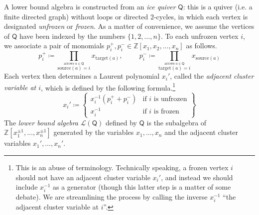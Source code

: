 \documentclass[ALCO,published]{cedram}
\numberwithin{equation}{section}
\renewcommand{\L}{\mathcal{L}}%
\newcommand{\1}{^{-1}}
\def\ZZ{\mathbb{Z}}
\def\Q{\mathsf{Q}}
\begin{document}
A lower bound algebra is constructed from an \textit{ice quiver} $\Q$: this is a quiver (i.e. a finite directed graph) without loops or directed $2$-cycles, in which each vertex is designated \textit{unfrozen} or \textit{frozen}.
As a matter of convenience, we assume the vertices of $\Q$ have been indexed by the numbers $\{1,2,\dots,n\}$.  To each unfrozen vertex $i$, we associate a pair of monomials $p_i^+,p_i^-\in \ZZ[x_1,x_2,\dots,x_n]$ as follows.
\begin{equation}
p_i^+ \coloneqq \prod_{\stackrel{\text{arrows }a\in \Q}{\text{source}(a)=i}}x_{\text{target}(a)},\hspace{1cm} p_i^- \coloneqq \prod_{\stackrel{\text{arrows }a\in \Q}{\text{target}(a)=i}}x_{\text{source}(a)}
\end{equation}
Each vertex then determines a Laurent polynomial $x_i'$, called the \textit{adjacent cluster variable at $i$}, which is defined by the following formula.\footnote{This is an abuse of terminology.  Technically speaking, a frozen vertex $i$ should not have an adjacent cluster variable $x_i'$, and instead we should include $x_i^{-1}$ as a generator (though this latter step is a matter of some debate).  We are streamlining the process by calling the inverse $x_i^{-1}$ ``the adjacent cluster variable at $i$''.}
\begin{equation}%
x_i' \coloneqq \left\{\begin{array}{cc}
x_i^{-1}(p_i^++p_i^-) & \text{if $i$ is unfrozen} \\
x_i^{-1} & \text{if $i$ is frozen}
\end{array}\right\}
\end{equation}
The \textit{lower bound algebra} $\L(\Q)$ defined by $\Q$ is the subalgebra of $\ZZ[x_1^{\pm1},\dots,x_n^{\pm1}]$ generated by the variables $x_1,\dots,x_n$ and the adjacent cluster variables $x_1',\dots,x_n'$.
\end{document}
